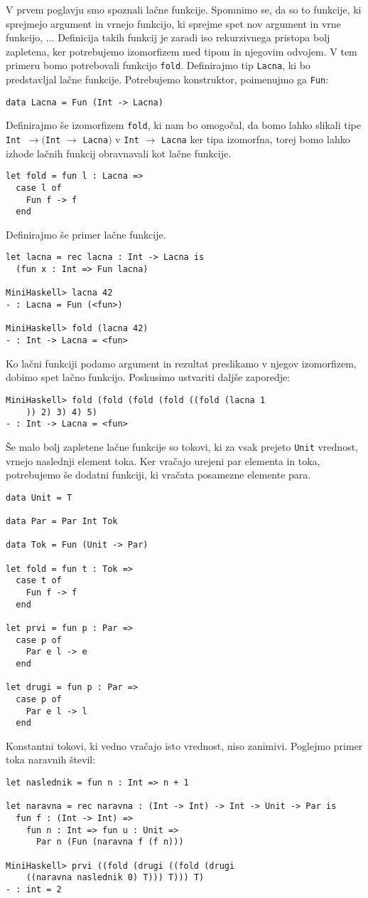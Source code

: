 \documentclass[12pt,a4paper,openany]{book}
\begin{document}
V prvem poglavju smo spoznali lačne funkcije. Spomnimo se, da so to funkcije, ki sprejmejo argument in vrnejo funkcijo, ki sprejme spet nov argument in vrne funkcijo, ... Definicija 
takih funkcij je zaradi iso rekurzivnega pristopa bolj zapletena, ker potrebujemo izomorfizem med tipom in njegovim odvojem. V tem primeru bomo potrebovali funkcijo \lstinline{fold}. 
Definirajmo tip \lstinline{Lacna}, ki bo predstavljal lačne funkcije. Potrebujemo konstruktor, poimenujmo ga \lstinline{Fun}:
\begin{lstlisting}
data Lacna = Fun (Int -> Lacna)
\end{lstlisting}
Definirajmo še izomorfizem \lstinline{fold}, ki nam bo omogočal, da bomo lahko slikali tipe \lstinline{Int }$\rightarrow ($\lstinline{Int} $\rightarrow$ \lstinline{Lacna}$)$ v \lstinline{Int} $\rightarrow$ \lstinline{Lacna} 
ker tipa izomorfna, torej bomo lahko izhode lačnih funkcij obravnavali kot lačne funkcije.
\begin{lstlisting}
let fold = fun l : Lacna =>
  case l of
    Fun f -> f
  end
\end{lstlisting}
Definirajmo še primer lačne funkcije.
\begin{lstlisting}
let lacna = rec lacna : Int -> Lacna is
  (fun x : Int => Fun lacna)

MiniHaskell> lacna 42
- : Lacna = Fun (<fun>)

MiniHaskell> fold (lacna 42)
- : Int -> Lacna = <fun>
\end{lstlisting}
Ko lačni funkciji podamo argument in rezultat preslikamo v njegov izomorfizem, dobimo spet lačno funkcijo. Poskusimo ustvariti daljše zaporedje:
\begin{lstlisting}
MiniHaskell> fold (fold (fold (fold ((fold (lacna 1
    )) 2) 3) 4) 5)
- : Int -> Lacna = <fun>
\end{lstlisting}

Še malo bolj zapletene lačne funkcije so tokovi, ki za vsak prejeto \lstinline{Unit} vrednost, vrnejo naslednji element toka. Ker vračajo urejeni 
par elementa in toka, potrebujemo še dodatni funkciji, ki vračata posamezne elemente para.
\begin{lstlisting}
data Unit = T

data Par = Par Int Tok

data Tok = Fun (Unit -> Par)

let fold = fun t : Tok =>
  case t of
    Fun f -> f
  end

let prvi = fun p : Par =>
  case p of
    Par e l -> e
  end

let drugi = fun p : Par =>
  case p of
    Par e l -> l
  end
\end{lstlisting}
Konstantni tokovi, ki vedno vračajo isto vrednost, niso zanimivi. Poglejmo 
primer toka naravnih števil:
\begin{lstlisting}
let naslednik = fun n : Int => n + 1

let naravna = rec naravna : (Int -> Int) -> Int -> Unit -> Par is
  fun f : (Int -> Int) =>
    fun n : Int => fun u : Unit =>
      Par n (Fun (naravna f (f n)))

MiniHaskell> prvi ((fold (drugi ((fold (drugi 
    ((naravna naslednik 0) T))) T))) T)
- : int = 2
\end{lstlisting}
\end{document}
